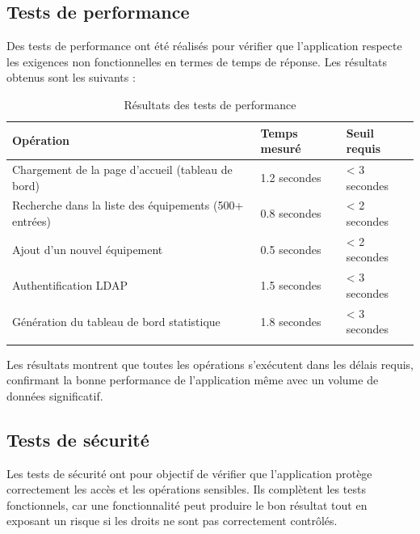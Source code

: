 \subsection{Tests de performance}

Des tests de performance ont été réalisés pour vérifier que l'application respecte les exigences non fonctionnelles en termes de temps de réponse. Les résultats obtenus sont les suivants :

\begin{longtable}{|m{6cm}|m{3cm}|m{3cm}|}
\hline
\textbf{Opération} & \textbf{Temps mesuré} & \textbf{Seuil requis} \\
\hline
\endhead
\endfoot
\endlastfoot
\hline
Chargement de la page d'accueil (tableau de bord) & 1.2 secondes & < 3 secondes \\
\hline
Recherche dans la liste des équipements (500+ entrées) & 0.8 secondes & < 2 secondes \\
\hline
Ajout d'un nouvel équipement & 0.5 secondes & < 2 secondes \\
\hline
Authentification LDAP & 1.5 secondes & < 3 secondes \\
\hline
Génération du tableau de bord statistique & 1.8 secondes & < 3 secondes \\
\hline
\captionsetup{justification=centering,margin=1cm}
\caption{Résultats des tests de performance}
\end{longtable}

Les résultats montrent que toutes les opérations s'exécutent dans les délais requis, confirmant la bonne performance de l'application même avec un volume de données significatif.

\subsection{Tests de sécurité}

Les tests de sécurité ont pour objectif de vérifier que l'application protège correctement les accès et les opérations sensibles. Ils complètent les tests fonctionnels, car une fonctionnalité peut produire le bon résultat tout en exposant un risque si les droits ne sont pas correctement contrôlés.

